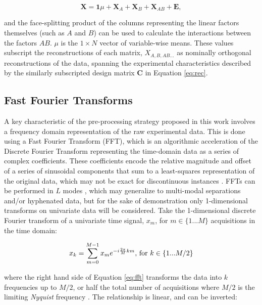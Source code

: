 \documentclass[preprint,12pt]{elsarticle}
\begin{document}
\begin{equation}
    \mathbf{X} = \mathbf{1}\mu + \mathbf{X}_A + \mathbf{X}_B + \mathbf{X}_{AB} + \mathbf{E},
\end{equation}

\noindent and the face-splitting product of the columns representing the linear factors themselves (such as $A$ and $B$) can be used to calculate the interactions between the factors $AB$. $\mu$ is the $1\times N$ vector of variable-wise means. These values subscript the reconstructions of each matrix, $X_{A,B,AB...}$ as nominally orthogonal reconstructions of the data, spanning the experimental characteristics described by the similarly subscripted design matrix $\mathbf{C}$ in Equation \ref{eq:rec}.

\subsection{Fast Fourier Transforms}

A key characteristic of the pre-processing strategy proposed in this work involves a frequency domain representation of the raw experimental data. This is done using a Fast Fourier Transform (FFT), which is an algorithmic acceleration of the Discrete Fourier Transform representing the time-domain data as a series of complex coefficients. These coefficients encode the relative magnitude and offset of a series of sinusoidal components that sum to a least-squares representation of the original data, which may not be exact for discontinuous instances \cite{nussbaumer1974gibbs}. FFTs can be performed in $L$ modes \cite{smith1995handbook}, which may generalize to multi-modal separations and/or hyphenated data, but for the sake of demonstration only 1-dimensional transforms on univariate data will be considered. Take the 1-dimensional discrete Fourier transform of a univariate time signal, $x_m$, for $m \in \{1...M\}$ acquisitions in the time domain:

\begin{equation}\label{eq:fft}
    x_k = \sum_{m=0}^{M-1} x_m e^{-i \frac{2\pi}{M} km}\textnormal{, for } k \in \{1...M/2\}
\end{equation}

\noindent where the right hand side of Equation \ref{eq:fft} transforms the data into $k$ frequencies up to $M/2$, or half the total number of acquisitions where $M/2$ is the limiting \textit{Nyquist} frequency \cite{smith1995handbook}. The relationship is linear, and can be inverted:
\end{document}
